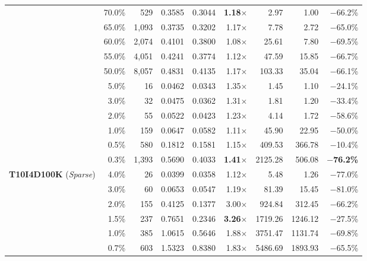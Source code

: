 \documentclass[conference]{IEEEtran}
\begin{document}
\begin{table}[t]
\begin{tabular*}{\textwidth}{@{\extracolsep{\fill}}lrrrrrrrr@{}}
 & 70.0\% & 529 & 0.3585 & 0.3044 & \textbf{1.18$\times$} & 2.97 & 1.00 & $-$66.2\% \\
 & 65.0\% & 1,093 & 0.3735 & 0.3202 & 1.17$\times$ & 7.78 & 2.72 & $-$65.0\% \\
 & 60.0\% & 2,074 & 0.4101 & 0.3800 & 1.08$\times$ & 25.61 & 7.80 & $-$69.5\% \\
 & 55.0\% & 4,051 & 0.4241 & 0.3774 & 1.12$\times$ & 47.59 & 15.85 & $-$66.7\% \\
 & 50.0\% & 8,057 & 0.4831 & 0.4135 & 1.17$\times$ & 103.33 & 35.04 & $-$66.1\% \\
\midrule
\rowcolor{gray!7} & 5.0\% & 16 & 0.0462 & 0.0343 & 1.35$\times$ & 1.45 & 1.10 & $-$24.1\% \\
\rowcolor{gray!7} & 3.0\% & 32 & 0.0475 & 0.0362 & 1.31$\times$ & 1.81 & 1.20 & $-$33.4\% \\
\rowcolor{gray!7} & 2.0\% & 55 & 0.0522 & 0.0423 & 1.23$\times$ & 4.14 & 1.72 & $-$58.6\% \\
\rowcolor{gray!7} & 1.0\% & 159 & 0.0647 & 0.0582 & 1.11$\times$ & 45.90 & 22.95 & $-$50.0\% \\
\rowcolor{gray!7} & 0.5\% & 580 & 0.1812 & 0.1581 & 1.15$\times$ & 409.53 & 366.78 & $-$10.4\% \\
\rowcolor{gray!7} \multirow{-6}{*}{\textbf{Retail} (\textit{Sparse})} & 0.3\% & 1,393 & 0.5690 & 0.4033 & \textbf{1.41$\times$} & 2125.28 & 506.08 & \textbf{$-$76.2\%} \\
\midrule
\multirow{6}{*}{\textbf{T10I4D100K} (\textit{Sparse})}
 & 4.0\% & 26 & 0.0399 & 0.0358 & 1.12$\times$ & 5.48 & 1.26 & $-$77.0\% \\
 & 3.0\% & 60 & 0.0653 & 0.0547 & 1.19$\times$ & 81.39 & 15.45 & $-$81.0\% \\
 & 2.0\% & 155 & 0.4125 & 0.1377 & 3.00$\times$ & 924.84 & 312.45 & $-$66.2\% \\
 & 1.5\% & 237 & 0.7651 & 0.2346 & \textbf{3.26$\times$} & 1719.26 & 1246.12 & $-$27.5\% \\
 & 1.0\% & 385 & 1.0615 & 0.5646 & 1.88$\times$ & 3751.47 & 1131.74 & $-$69.8\% \\
 & 0.7\% & 603 & 1.5323 & 0.8380 & 1.83$\times$ & 5486.69 & 1893.93 & $-$65.5\% \\
\bottomrule
\end{tabular*}
\end{table}
\end{document}
